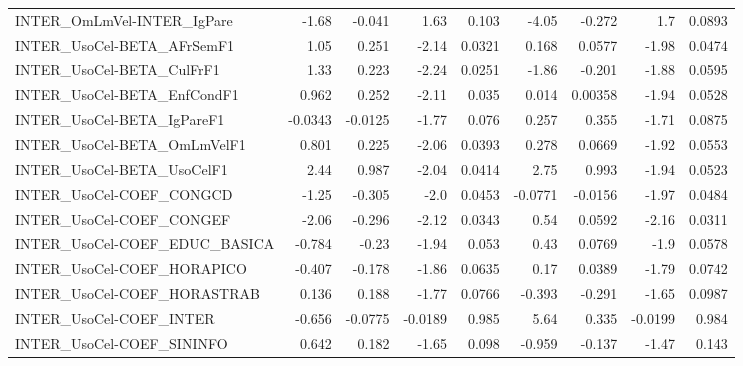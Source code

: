 \begin{tabular}{lrrrrrrrr}
INTER\_OmLmVel-INTER\_IgPare            &       -1.68 &       -0.041 &     1.63 &    0.103 &      -4.05 &      -0.272 &          1.7 &        0.0893 \\
INTER\_UsoCel-BETA\_AFrSemF1            &        1.05 &        0.251 &    -2.14 &   0.0321 &      0.168 &      0.0577 &        -1.98 &        0.0474 \\
INTER\_UsoCel-BETA\_CulFrF1             &        1.33 &        0.223 &    -2.24 &   0.0251 &      -1.86 &      -0.201 &        -1.88 &        0.0595 \\
INTER\_UsoCel-BETA\_EnfCondF1           &       0.962 &        0.252 &    -2.11 &    0.035 &      0.014 &     0.00358 &        -1.94 &        0.0528 \\
INTER\_UsoCel-BETA\_IgPareF1            &     -0.0343 &      -0.0125 &    -1.77 &    0.076 &      0.257 &       0.355 &        -1.71 &        0.0875 \\
INTER\_UsoCel-BETA\_OmLmVelF1           &       0.801 &        0.225 &    -2.06 &   0.0393 &      0.278 &      0.0669 &        -1.92 &        0.0553 \\
INTER\_UsoCel-BETA\_UsoCelF1            &        2.44 &        0.987 &    -2.04 &   0.0414 &       2.75 &       0.993 &        -1.94 &        0.0523 \\
INTER\_UsoCel-COEF\_CONGCD              &       -1.25 &       -0.305 &     -2.0 &   0.0453 &    -0.0771 &     -0.0156 &        -1.97 &        0.0484 \\
INTER\_UsoCel-COEF\_CONGEF              &       -2.06 &       -0.296 &    -2.12 &   0.0343 &       0.54 &      0.0592 &        -2.16 &        0.0311 \\
INTER\_UsoCel-COEF\_EDUC\_BASICA         &      -0.784 &        -0.23 &    -1.94 &    0.053 &       0.43 &      0.0769 &         -1.9 &        0.0578 \\
INTER\_UsoCel-COEF\_HORAPICO            &      -0.407 &       -0.178 &    -1.86 &   0.0635 &       0.17 &      0.0389 &        -1.79 &        0.0742 \\
INTER\_UsoCel-COEF\_HORASTRAB           &       0.136 &        0.188 &    -1.77 &   0.0766 &     -0.393 &      -0.291 &        -1.65 &        0.0987 \\
INTER\_UsoCel-COEF\_INTER               &      -0.656 &      -0.0775 &  -0.0189 &    0.985 &       5.64 &       0.335 &      -0.0199 &         0.984 \\
INTER\_UsoCel-COEF\_SININFO             &       0.642 &        0.182 &    -1.65 &    0.098 &     -0.959 &      -0.137 &        -1.47 &         0.143 \\

\end{tabular}
